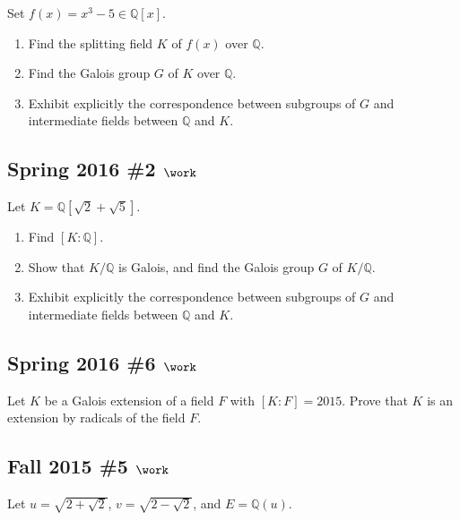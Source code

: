 Set \(f(x) = x^3 - 5 \in {\mathbb{Q}}[x]\).

\begin{enumerate}
\def\labelenumi{\alph{enumi}.}
\item
  Find the splitting field \(K\) of \(f(x)\) over \({\mathbb{Q}}\).
\item
  Find the Galois group \(G\) of \(K\) over \({\mathbb{Q}}\).
\item
  Exhibit explicitly the correspondence between subgroups of \(G\) and
  intermediate fields between \({\mathbb{Q}}\) and \(K\).
\end{enumerate}

\hypertarget{spring-2016-2-work}{%
\subsection{\texorpdfstring{Spring 2016 \#2
\(\work\)}{Spring 2016 \#2 \textbackslash work}}\label{spring-2016-2-work}}

Let \(K = {\mathbb{Q}}[\sqrt 2 + \sqrt 5]\).

\begin{enumerate}
\def\labelenumi{\alph{enumi}.}
\item
  Find \([K: {\mathbb{Q}}]\).
\item
  Show that \(K/{\mathbb{Q}}\) is Galois, and find the Galois group
  \(G\) of \(K/{\mathbb{Q}}\).
\item
  Exhibit explicitly the correspondence between subgroups of \(G\) and
  intermediate fields between \({\mathbb{Q}}\) and \(K\).
\end{enumerate}

\hypertarget{spring-2016-6-work}{%
\subsection{\texorpdfstring{Spring 2016 \#6
\(\work\)}{Spring 2016 \#6 \textbackslash work}}\label{spring-2016-6-work}}

Let \(K\) be a Galois extension of a field \(F\) with \([K: F] = 2015\).
Prove that \(K\) is an extension by radicals of the field \(F\).

\hypertarget{fall-2015-5-work}{%
\subsection{\texorpdfstring{Fall 2015 \#5
\(\work\)}{Fall 2015 \#5 \textbackslash work}}\label{fall-2015-5-work}}

Let \(u = \sqrt{2 + \sqrt{2}}\), \(v = \sqrt{2 - \sqrt{2}}\), and
\(E = {\mathbb{Q}}(u)\).

